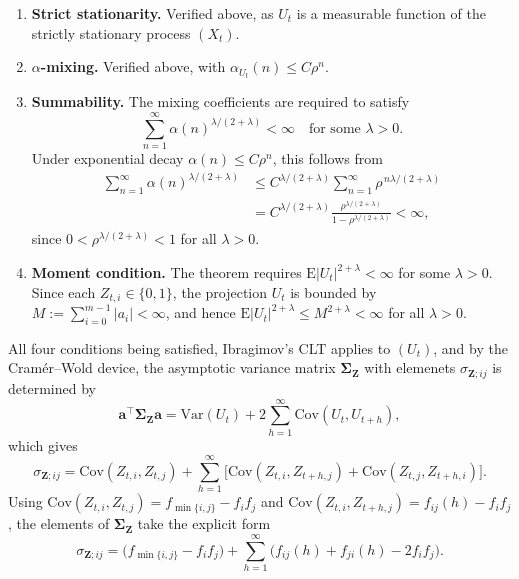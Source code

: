 ﻿\documentclass[12pt,a4paper]{scrreprt}
\theoremstyle{definition}
\begin{document}
\begin{enumerate}
    \item[\normalfont(i)] \textbf{Strict stationarity.} Verified above, as $U_t$ is
    a measurable function of the strictly stationary process $(X_t)$.
    
    \item[\normalfont(ii)] \textbf{$\alpha$-mixing.} Verified above, with
    $\alpha_{U_t}(n) \le C\rho^n$.
    
    \item[\normalfont(iii)] \textbf{Summability.} The mixing coefficients are required
    to satisfy
    \[
    \sum_{n=1}^{\infty} \alpha(n)^{\lambda/(2+\lambda)} < \infty
    \quad \text{for some } \lambda > 0.
    \]
    Under exponential decay $\alpha(n) \le C\rho^n$, this follows from
    \begin{align*}
    \sum_{n=1}^{\infty} \alpha(n)^{\lambda/(2+\lambda)}
    &\le C^{\lambda/(2+\lambda)} \sum_{n=1}^{\infty} \rho^{\,n\lambda/(2+\lambda)} \\
    &= C^{\lambda/(2+\lambda)} \frac{\rho^{\lambda/(2+\lambda)}}
    {1-\rho^{\lambda/(2+\lambda)}} < \infty,
    \end{align*}
    since $0 < \rho^{\lambda/(2+\lambda)} < 1$ for all $\lambda > 0$.
    
    \item[\normalfont(iv)] \textbf{Moment condition.} The theorem requires
    $\mathrm{E}|U_t|^{2+\lambda} < \infty$ for some $\lambda > 0$. Since each
    $Z_{t,i} \in \{0,1\}$, the projection $U_t$ is bounded by
    $M := \sum_{i=0}^{m-1}|a_i| < \infty$, and hence
    $\mathrm{E}|U_t|^{2+\lambda} \le M^{2+\lambda} < \infty$ for all $\lambda > 0$.
\end{enumerate}
All four conditions being satisfied, Ibragimov's CLT applies to $(U_t)$, and by the 
Cramér--Wold device, the asymptotic variance matrix $\boldsymbol{\Sigma}_{\boldsymbol{Z}}$ with elemenets $\sigma_{\boldsymbol{Z};ij}$ is determined by
\[
\boldsymbol{a}^{\top}\boldsymbol{\Sigma}_{\boldsymbol{Z}}\boldsymbol{a} = \mathrm{Var}(U_t)
+ 2\sum_{h=1}^{\infty}\mathrm{Cov}(U_t, U_{t+h}),
\]
which gives
\[
\sigma_{\boldsymbol{Z};ij} = \mathrm{Cov}(Z_{t,i}, Z_{t,j})
+ \sum_{h=1}^{\infty}\bigl[\mathrm{Cov}(Z_{t,i}, Z_{t+h,j}) 
+ \mathrm{Cov}(Z_{t,j}, Z_{t+h,i})\bigr].
\]
Using $\mathrm{Cov}(Z_{t,i}, Z_{t,j}) = f_{\min\{i,j\}} - f_i f_j$ and
$\mathrm{Cov}(Z_{t,i}, Z_{t+h,j}) = f_{ij}(h) - f_i f_j$, the elements of
$\boldsymbol{\Sigma}_{\boldsymbol{Z}}$ take the explicit form
\[
\sigma_{\boldsymbol{Z};ij} = \bigl(f_{\min\{i,j\}} - f_i f_j\bigr)
+ \sum_{h=1}^{\infty}\bigl(f_{ij}(h) + f_{ji}(h) - 2f_i f_j\bigr).
\]
\end{document}
